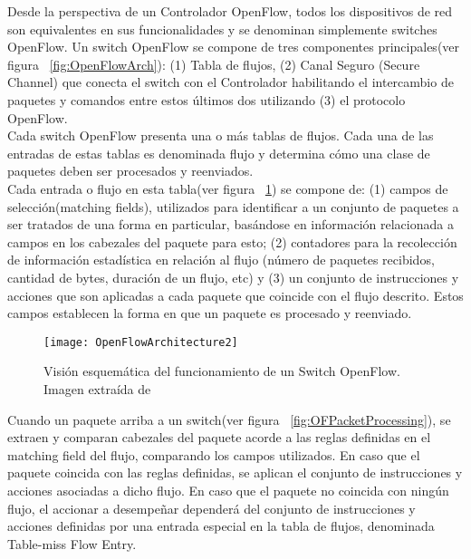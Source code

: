 Desde la perspectiva de un Controlador OpenFlow, todos los dispositivos de red son equivalentes en sus funcionalidades y se denominan simplemente switches OpenFlow. Un switch OpenFlow se compone de tres componentes principales(ver figura ~\ref{fig:OpenFlowArch}): (1) Tabla de flujos, (2) Canal Seguro (Secure Channel) que conecta el switch con el Controlador habilitando el intercambio de paquetes y comandos entre estos últimos dos utilizando (3) el protocolo OpenFlow.\\
 
Cada switch OpenFlow presenta una o m\'as tablas de flujos. Cada una de las entradas de estas tablas es denominada flujo y determina c\'omo una clase de paquetes deben ser procesados y reenviados.\\

Cada entrada o flujo en esta tabla(ver figura ~\ref{fig:OpenFlowArch2}) se compone de: (1) campos de selección(matching fields), utilizados para identificar a un conjunto de paquetes a ser tratados de una forma en particular, basándose en información relacionada a campos en los cabezales del paquete para esto; (2) contadores para la recolección de información estadística en relación al flujo (n\'umero de paquetes recibidos, cantidad de bytes, duración de un flujo, etc) y (3) un conjunto de instrucciones y acciones que son aplicadas a cada paquete que coincide con el flujo descrito. Estos campos establecen la forma en que un paquete es procesado y reenviado.
 
\begin{figure}[htbp!] 
\centering    
\texttt{[image: OpenFlowArchitecture2]}
\caption[Visión esquemática del funcionamiento de un Switch OpenFlow]{Visión esquemática del funcionamiento de un Switch OpenFlow. Imagen extraída de \cite{mckeown2008openflow}}
\label{fig:OpenFlowArch2}
\end{figure}

Cuando un paquete arriba a un switch(ver figura ~\ref{fig:OFPacketProcessing}), se extraen y comparan cabezales del paquete acorde a las reglas definidas en el matching field del flujo, comparando los campos utilizados. En caso que el paquete coincida con las reglas definidas, se aplican el conjunto de instrucciones y acciones asociadas a dicho flujo. En caso que el paquete no coincida con ningún flujo, el accionar a desempeñar dependerá del conjunto de instrucciones y acciones definidas por una entrada especial en la tabla de flujos, denominada Table-miss Flow Entry.\\ 

